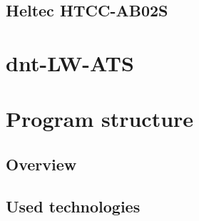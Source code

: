
\subsection{Heltec HTCC-AB02S}

\section{dnt-LW-ATS}


\section{Program structure}

\subsection{Overview}

\subsection{Used technologies}